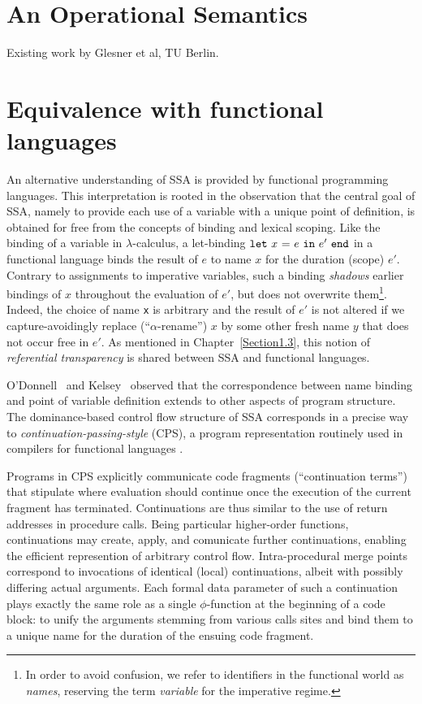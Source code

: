 
\section{An Operational Semantics}
\label{section:Part1:Semantics:GlesnerSemantics}

Existing work by Glesner et al, TU Berlin.



\section{Equivalence with functional languages}
\label{section:Part1:Semantics:FunctionalLanguages}

An alternative understanding of SSA is provided by functional
programming languages. This interpretation is rooted in the
observation that the central goal of SSA, namely to provide each use
of a variable with a unique point of definition, is obtained for free
from the concepts of binding and lexical scoping. Like the binding of
a variable in $\lambda$-calculus, a let-binding
$\mathtt{let}\ {x}\ \mathtt{=}\ {e}\ \mathtt{in}\ {e'}\ \mathtt{end}$ in a functional language binds the result
of $e$ to name $x$ for the duration (scope) $e'$.
Contrary to assignments to imperative variables, such a binding
\emph{shadows} earlier bindings of $x$ throughout the evaluation
of $e'$, but does not overwrite them\footnote{In order to avoid
confusion, we refer to identifiers in the functional world as
\emph{names}, reserving the term \emph{variable} for the imperative
regime.}. Indeed, the choice of name \verb|x| is arbitrary and the
result of $e'$ is not altered if we capture-avoidingly replace
(``$\alpha$-rename'') $x$ by some other fresh name $y$ that does not
occur free in $e'$. As mentioned in Chapter~\ref{Section1.3}, this
notion of \emph{referential transparency} is shared between SSA and
functional languages.

O'Donnell~\cite{ODonnellPhD} and Kelsey~\cite{Kelsey95} observed that
the correspondence between name binding and point of variable
definition extends to other aspects of program structure. The
dominance-based control flow structure of SSA corresponds in a precise
way to \emph{continuation-passing-style} (CPS), a program
representation routinely used in compilers for functional languages
\cite{DBLP:journals/lisp/SussmanS98a,Appel:CWC}.

Programs in CPS explicitly communicate code fragments (``continuation
terms'') that stipulate where evaluation should continue once the
execution of the current fragment has terminated. Continuations are
thus similar to the use of return addresses in procedure calls. Being
particular higher-order functions, continuations may create, apply,
and comunicate further continuations, enabling the efficient
represention of arbitrary control flow.  Intra-procedural 
merge points correspond to invocations of identical (local)
continuations, albeit with possibly differing actual arguments.
Each formal data parameter of such a continuation plays exactly the
same role as a single $\phi$-function at the beginning of a code
block: to unify the arguments stemming from various calls sites and
bind them to a unique name for the duration of the ensuing code
fragment.

